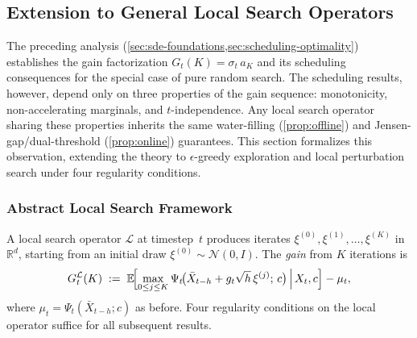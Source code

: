 \subsection{Extension to General Local Search Operators}
\label{sec:general-local-search}

The preceding analysis
(\cref{sec:sde-foundations,sec:scheduling-optimality}) establishes the
gain factorization $G_t(K)=\sigma_t\,a_K$ and its scheduling
consequences for the special case of pure random search.
The scheduling results, however,
depend only on three properties of the gain sequence:
monotonicity, non-accelerating marginals, and $t$-independence.
Any local search operator sharing these properties inherits
the same water-filling (\cref{prop:offline}) and
Jensen-gap/dual-threshold (\cref{prop:online}) guarantees.
This section formalizes this observation, extending the theory to
$\epsilon$-greedy exploration and local perturbation search under
four regularity conditions.

\subsubsection{Abstract Local Search Framework}
\label{sec:abstract-ls}

A local search operator $\mathcal{L}$ at timestep~$t$ produces iterates
$\xi^{(0)},\xi^{(1)},\ldots,\xi^{(K)}$ in $\mathbb{R}^d$,
starting from an initial draw $\xi^{(0)}\sim\mathcal{N}(0,I)$.
The \emph{gain} from $K$ iterations is
\begin{equation}
  G_t^{\mathcal{L}}(K)
  \;:=\;
  \mathbb{E}\!\Bigl[
    \max_{0\le j\le K}
    \Psi_t\!\bigl(\bar{X}_{t-h}+g_t\sqrt{h}\,\xi^{(j)};\,c\bigr)
  \,\Big|\, X_t,c\Bigr]
  -\mu_t,
  \label{eq:gain-general}
\end{equation}
where $\mu_t=\Psi_t(\bar{X}_{t-h};c)$ as before.
Four regularity conditions on the local operator suffice for all subsequent results.

